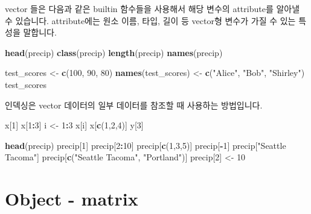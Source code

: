 \documentclass[
]{book}
\newenvironment{Shaded}{\begin{snugshade}}{\end{snugshade}}
\newcommand{\DecValTok}[1]{\textcolor[rgb]{0.00,0.00,0.81}{#1}}
\newcommand{\KeywordTok}[1]{\textcolor[rgb]{0.13,0.29,0.53}{\textbf{#1}}}
\newcommand{\NormalTok}[1]{#1}
\newcommand{\OperatorTok}[1]{\textcolor[rgb]{0.81,0.36,0.00}{\textbf{#1}}}
\newcommand{\StringTok}[1]{\textcolor[rgb]{0.31,0.60,0.02}{#1}}
\begin{document}
vector 들은 다음과 같은 builtin 함수들을 사용해서 해당 변수의 attribute를 알아낼 수 있습니다. attribute에는 원소 이름, 타입, 길이 등 vector형 변수가 가질 수 있는 특성을 말합니다.

\begin{Shaded}
\begin{Highlighting}[]
\KeywordTok{head}\NormalTok{(precip)}
\KeywordTok{class}\NormalTok{(precip)}
\KeywordTok{length}\NormalTok{(precip)}
\KeywordTok{names}\NormalTok{(precip)}

\NormalTok{test\_scores <{-}}\StringTok{ }\KeywordTok{c}\NormalTok{(}\DecValTok{100}\NormalTok{, }\DecValTok{90}\NormalTok{, }\DecValTok{80}\NormalTok{)}
\KeywordTok{names}\NormalTok{(test\_scores) <{-}}\StringTok{ }\KeywordTok{c}\NormalTok{(}\StringTok{"Alice"}\NormalTok{, }\StringTok{"Bob"}\NormalTok{, }\StringTok{"Shirley"}\NormalTok{)}
\NormalTok{test\_scores}
\end{Highlighting}
\end{Shaded}

인덱싱은 vector 데이터의 일부 데이터를 참조할 때 사용하는 방법입니다.

\begin{Shaded}
\begin{Highlighting}[]
\NormalTok{x[}\DecValTok{1}\NormalTok{]}
\NormalTok{x[}\DecValTok{1}\OperatorTok{:}\DecValTok{3}\NormalTok{]}
\NormalTok{i <{-}}\StringTok{ }\DecValTok{1}\OperatorTok{:}\DecValTok{3}
\NormalTok{x[i]}
\NormalTok{x[}\KeywordTok{c}\NormalTok{(}\DecValTok{1}\NormalTok{,}\DecValTok{2}\NormalTok{,}\DecValTok{4}\NormalTok{)]}
\NormalTok{y[}\DecValTok{3}\NormalTok{]}

\KeywordTok{head}\NormalTok{(precip)}
\NormalTok{precip[}\DecValTok{1}\NormalTok{]}
\NormalTok{precip[}\DecValTok{2}\OperatorTok{:}\DecValTok{10}\NormalTok{]}
\NormalTok{precip[}\KeywordTok{c}\NormalTok{(}\DecValTok{1}\NormalTok{,}\DecValTok{3}\NormalTok{,}\DecValTok{5}\NormalTok{)]}
\NormalTok{precip[}\OperatorTok{{-}}\DecValTok{1}\NormalTok{]}
\NormalTok{precip[}\StringTok{"Seattle Tacoma"}\NormalTok{]}
\NormalTok{precip[}\KeywordTok{c}\NormalTok{(}\StringTok{"Seattle Tacoma"}\NormalTok{, }\StringTok{"Portland"}\NormalTok{)]}
\NormalTok{precip[}\DecValTok{2}\NormalTok{] <{-}}\StringTok{ }\DecValTok{10}
\end{Highlighting}
\end{Shaded}

\hypertarget{object---matrix}{%
\section{Object - matrix}\label{object---matrix}}
\end{document}
